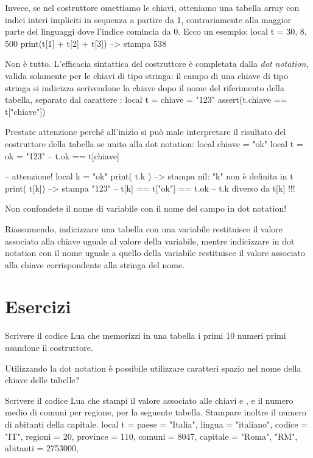 Invece, se nel costruttore omettiamo le chiavi, otteniamo una tabella array con
indici interi impliciti in sequenza a partire da 1, contrariamente alla maggior
parte dei linguaggi dove l'indice comincia da 0. Ecco un esempio:
\lines
local t = { 30, 8, 500 }
print(t[1] + t[2] + t[3]) --> stampa 538
\endlines
{}

Non è tutto. L'efficacia sintattica del costruttore è completata dalla
\emph{dot notation}, valida solamente per le chiavi di tipo stringa: il campo di
una chiave di tipo stringa si indicizza scrivendone la chiave dopo il nome del
riferimento della tabella, separato dal carattere :
\lines
local t = { chiave = "123" }
assert(t.chiave == t["chiave"])
\endlines
{}

Prestate attenzione perché all'inizio si può male interpretare il risultato del
costruttore della tabella se unito alla dot notation:
\lines
local chiave = "ok"
local t = { ok = "123"} -- t.ok == t[chiave]

-- attenzione!
local k = "ok"
print( t.k ) --> stampa nil: "k" non è definita in t
print( t[k]) --> stampa "123"
-- t[k] == t["ok"] == t.ok
-- t.k diverso da t[k] !!!
\endlines
{}

Non confondete il nome di variabile con il nome del campo in dot notation!

Riassumendo, indicizzare una tabella con una variabile restituisce il valore
associato alla chiave uguale al valore della variabile, mentre indicizzare in
dot notation con il nome uguale a quello della variabile restituisce il valore
associato alla chiave corrispondente alla stringa del nome.


\section{Esercizi}

\begin{Exercise}[label={tab-01}]
Scrivere il codice Lua che memorizzi in una tabella i primi 10 numeri primi
usandone il costruttore.
\end{Exercise}

\begin{Exercise}[label={tab-02}]
Utilizzando la dot notation è possibile utilizzare caratteri spazio nel nome
della chiave delle tabelle?
\end{Exercise}

\begin{Exercise}[label={tab-03}]
Scrivere il codice Lua che stampi il valore associato alle chiavi  e
, e il numero medio di comuni per regione, per la seguente tabella.
Stampare inoltre il numero di abitanti della capitale.
\lines
local t = {
    paese = "Italia",
    lingua = "italiano",
    codice = "IT",
    regioni = 20,
    province = 110,
    comuni = 8047,
    capitale = {"Roma", "RM", abitanti = 2753000},
}
\endlines
{}
\end{Exercise}


